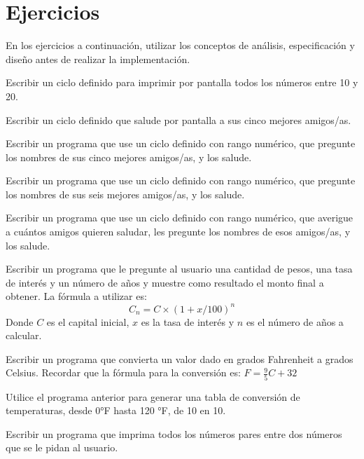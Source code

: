\newpage
\section{Ejercicios}
En los ejercicios a continuación, utilizar los conceptos de análisis,
especificación y diseño antes de realizar la implementación.

\begin{partes}
	\item Escribir un ciclo definido para imprimir por pantalla 
todos los números entre 10 y 20.
	\item Escribir un ciclo definido que salude por pantalla a 
sus cinco mejores amigos/as.
	\item Escribir un programa que use un ciclo definido con 
rango numérico, que pregunte los nombres de sus cinco mejores
amigos/as, y los salude.
	\item Escribir un programa que use un ciclo definido con
rango numérico, que pregunte los nombres de sus seis mejores
amigos/as, y los salude.
	\item Escribir un programa que use un ciclo definido con
rango numérico, que averigue a cuántos amigos quieren saludar, les
pregunte los nombres de esos amigos/as, y los salude.
\end{partes}

\begin{ejercicio} 
Escribir un programa que le pregunte al usuario una cantidad de pesos,
una tasa de interés y un número de años y muestre como resultado el monto
final a obtener.  La fórmula a utilizar es:
\begin{displaymath}
C_n = C \times (1+x/100)^n
\end{displaymath}
Donde $C$ es el capital inicial, $x$ es la tasa de interés y $n$ es el
número de años a calcular.
\end{ejercicio}

\begin{ejercicio}
Escribir un programa que convierta un valor dado en grados Fahrenheit a
grados Celsius.  Recordar que la fórmula para la conversión es:
$F = \frac{9}{5}C+32$
\end{ejercicio}

\begin{ejercicio}
Utilice el programa anterior para generar una tabla de conversión de
temperaturas, desde 0°F hasta 120 °F, de 10 en 10.
\end{ejercicio}

\begin{ejercicio}
Escribir un programa que imprima todos los números pares entre dos números
que se le pidan al usuario.
\end{ejercicio}

